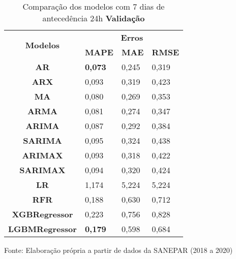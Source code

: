 \begin{table}[H]
	\centering
	\caption{Comparação dos modelos com 7 dias de antecedência 24h \textbf{Validação} }\label{tb:10-24vld}
	\begin{tabular}{@{}clll@{}}
		\toprule
		\multirow{2}{*}{\textbf{Modelos}} & \multicolumn{3}{c}{\textbf{Erros}}                                                                       \\ \cmidrule(l){2-4} 
		& \multicolumn{1}{c}{\textbf{MAPE}} & \multicolumn{1}{c}{\textbf{MAE}} & \multicolumn{1}{c}{\textbf{RMSE}} \\ \hline
\textbf{AR}                       & \textbf{0,073}                             & 0,245                            & 0,319                             \\
\textbf{ARX}                      & 0,093                             & 0,319                            & 0,423                             \\
\textbf{MA}                       & 0,080                             & 0,269                            & 0,353                             \\
\textbf{ARMA}                     & 0,081                             & 0,274                            & 0,347                             \\
\textbf{ARIMA}                    & 0,087                             & 0,292                            & 0,384                             \\
\textbf{SARIMA}                   & 0,095                             & 0,324                            & 0,438                             \\
\textbf{ARIMAX}                   & 0,093                             & 0,318                            & 0,422                             \\
\textbf{SARIMAX}                  & 0,094                             & 0,320                            & 0,424                             \\
\textbf{LR}                       & 1,174                             & 5,224                            & 5,224                             \\
\textbf{RFR}                      & 0,188                             & 0,630                            & 0,712                             \\
\textbf{XGBRegressor}             & 0,223                             & 0,756                            & 0,828                             \\
\textbf{LGBMRegressor}            & \textbf{0,179}                             & 0,598                            & 0,684                             \\ \bottomrule
	\end{tabular}

Fonte: Elaboração própria a partir de dados da SANEPAR (2018 a 2020)
\end{table}

